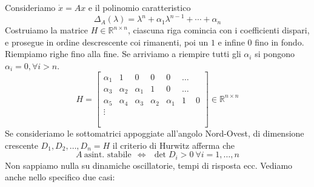 Consideriamo $\dot{x} =Ax$ e il polinomio caratteristico
\begin{equation*}
	\Delta _A\left(\lambda \right) =\lambda ^n +\alpha _1 \lambda ^{n-1} +\cdots +\alpha _n
\end{equation*}
Costruiamo la matrice $H\in \mathbb{R}^{n\times n}$, ciascuna riga comincia con i coefficienti dispari, e prosegue in ordine descrescente coi rimanenti, poi un $1$ e infine $0$ fino in fondo. Riempiamo righe fino alla fine. Se arriviamo a riempire tutti gli $\alpha _i$ si pongono $\alpha _i =0,\forall i >n$.
\begin{equation*}
	H=\begin{bmatrix}
	\alpha _1 & 1 & 0 & 0 & 0 & \dotsc  & \\
	\alpha _3 & \alpha _2 & \alpha _1 & 1 & 0 & \dotsc  & \\
	\alpha _5 & \alpha _4 & \alpha _3 & \alpha _2 & \alpha _1 & 1 & 0\\
	\vdots  &  &  &  &  &  & \\
	&  &  &  &  &  & \\
	&  &  &  &  &  & \\
	&  &  &  &  &  & 
	\end{bmatrix} \in \mathbb{R}^{n\times n}
\end{equation*}
Se consideriamo le sottomatrici appoggiate all'angolo Nord-Ovest, di dimensione crescente $D_1 ,D_2 ,\dotsc ,D_n =H$ il criterio di Hurwitz afferma che
\begin{equation*}
	\boxed{A\ \text{asint. stabile} \ \ \iff \ \ \det D_i  >0\ \forall i=1,\dotsc ,n}
\end{equation*}
Non sappiamo nulla su dinamiche oscillatorie, tempi di risposta ecc. Vediamo anche nello specifico due casi:
